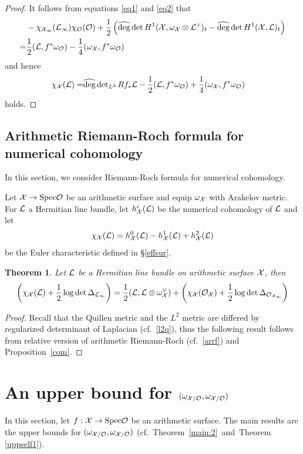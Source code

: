 \documentclass[]{amsart}
\newcommand{\CO}{{\mathcal {O}}} \newcommand{\CP}{{\mathcal {P}}}
\newcommand{\Spec}{{\mathrm{Spec}}} \newcommand{\Spf}{{\mathrm{Spf}}}
\newcommand{\wh}{\widehat}
\newcommand{\ra}{\rightarrow} \newcommand{\imp}{\Longrightarrow}
\theoremstyle{plain}
\newtheorem{thm}{Theorem}[section] \newtheorem{cor}[thm]{Corollary}
\theoremstyle{remark} \newtheorem{remark}[thm]{Remark}
\theoremstyle{remark} \newtheorem{exercise}{Exercise}
\theoremstyle{remark} \newtheorem{example}{Example}
\numberwithin{equation}{section}
\begin{document}
\begin{proof}
  It follows from equations \eqref{eq1} and \eqref{eq2} that 
  \[\begin{aligned}
    &-\chi_{\CX_\infty}(\CL_\infty)\chi_{\CO}(\CO)+\frac{1}{2}\left(\wh{\deg}\det H^1(\CX,\omega_{\CX}\otimes \CL^\vee)_t-\wh{\deg}\det H^1(\CX,\CL)_t\right)\\
    =&\frac{1}{2}(\CL,f^*\omega_{\CO})-\frac{1}{4}(\omega_{\CX},f^*\omega_\CO)
  \end{aligned}\] and hence 
\[\begin{aligned}
 \chi_{\CX}(\CL)=&\wh{\deg}\det\nolimits_{L^2}Rf_*\CL-\frac{1}{2}(\CL,f^*\omega_{\CO})+\frac{1}{4}(\omega_{\CX},f^*\omega_{\CO})
\end{aligned}
\]holds.
\end{proof}

\subsection{Arithmetic Riemann-Roch formula for numerical  cohomology}\label{aarr}
In this section, we consider Riemann-Roch formula for numerical cohomology.

Let $\CX\ra \Spec\CO$ be an arithmetic surface and equip $\omega_{{\mathcal {X}}}$ with Arakelov metric. For ${\mathcal {L}}$ a Hermitian line bundle, let $h^i_{\mathcal {X}}({\mathcal {L}})$ be the numerical cohomology of ${\mathcal {L}}$ and let \[\chi_{{\mathcal {X}}}({\mathcal {L}})=h^0_{{\mathcal {X}}}({\mathcal {L}})-h^1_{{\mathcal {X}}}({\mathcal {L}})+h^2_{\mathcal {X}}({\mathcal {L}})\] be the Euler characteristic defined in \S\ref{effsur}.
\begin{thm}\label{main:RR}Let ${\mathcal {L}}$ be a Hermitian line bundle on arithmetic surface ${\mathcal {X}}$, then
\[\left(\chi_\CX(\CL)+\frac{1}{2}\log \det \Delta_{\CL_\infty}\right)=\frac{1}{2}(\CL,\CL\otimes \omega_{\CX}^\vee)+\left(\chi_\CX(\CO_{\CX})+\frac{1}{2}\log \det\Delta_{\CO_{\CX_\infty}} \right)\]
\end{thm} 

\begin{proof} 
Recall that the Quillen metric and the $L^2$ metric are differed by regularized determinant of Laplacian (cf.~\eqref{l2q}), thus the following result follows from relative version of arithmetic Riemann-Roch (cf.~\eqref{arrf}) and Proposition~\ref{com}.
\end{proof}

\section{An upper bound for $(\omega_{\CX/\CO},\omega_{\CX/\CO})$}

In this section, let $f:\CX\ra \Spec\CO$ be an arithmetic surface. The main results are the upper bounds for $(\omega_{\CX/\CO},\omega_{\CX/\CO})$ (cf.~Theorem~\ref{main:2}~and~Theorem \ref{uppself1}).
\end{document}
